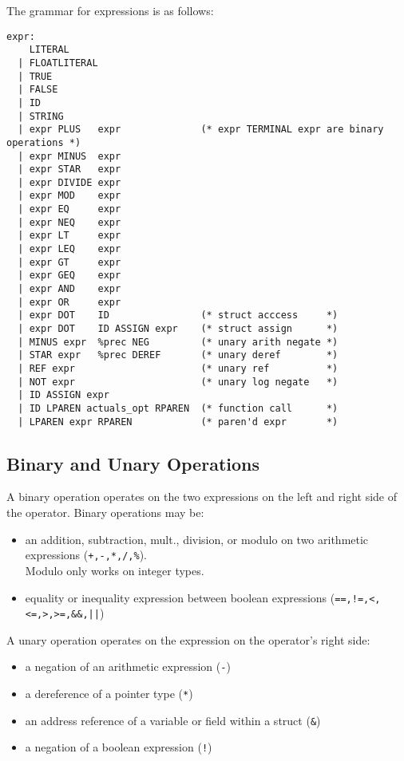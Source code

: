     \bigskip\noindent The grammar for expressions is as follows:
    \begin{verbatim}
expr:
    LITERAL       
  | FLOATLITERAL     
  | TRUE          
  | FALSE            
  | ID            
  | STRING      
  | expr PLUS   expr              (* expr TERMINAL expr are binary operations *)
  | expr MINUS  expr 
  | expr STAR   expr 
  | expr DIVIDE expr 
  | expr MOD    expr 
  | expr EQ     expr 
  | expr NEQ    expr 
  | expr LT     expr 
  | expr LEQ    expr 
  | expr GT     expr 
  | expr GEQ    expr 
  | expr AND    expr 
  | expr OR     expr
  | expr DOT    ID                (* struct acccess     *)
  | expr DOT    ID ASSIGN expr    (* struct assign      *)
  | MINUS expr  %prec NEG         (* unary arith negate *)
  | STAR expr   %prec DEREF       (* unary deref        *)
  | REF expr                      (* unary ref          *)
  | NOT expr                      (* unary log negate   *)
  | ID ASSIGN expr  
  | ID LPAREN actuals_opt RPAREN  (* function call      *)
  | LPAREN expr RPAREN            (* paren'd expr       *)
    \end{verbatim}


    \subsection{Binary and Unary Operations}
      A binary operation operates on the two expressions on the left and right side of the operator. Binary operations may be:
    \begin{itemize}
      \item an addition, subtraction, mult., division, or modulo on two arithmetic expressions (\texttt{+,-,*,/,\%}).\\ Modulo only works on integer types.
      \item  equality or inequality expression between boolean expressions (\verb^==,!=,<,<=,>,>=,&&,||^)
    \end{itemize}

    \noindent
    A unary operation operates on the expression on the operator's right side:
    \begin{itemize}
      \item a negation of an arithmetic expression (\texttt{-})
      \item a dereference of a pointer type (\texttt{*})
      \item an address reference of a variable or field within a struct (\verb|&|)
      \item a negation of a boolean expression (\texttt{!})
    \end{itemize}


